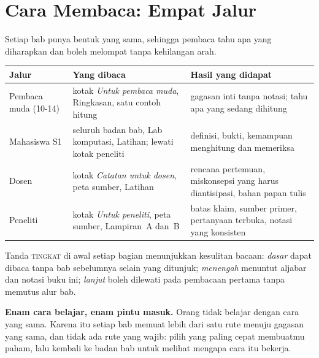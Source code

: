 \chapter*{Cara Membaca: Empat Jalur}

Setiap bab punya bentuk yang sama, sehingga pembaca tahu apa yang diharapkan dan
boleh melompat tanpa kehilangan arah.

\begin{center}
\small
\begin{tabular}{@{}p{3.1cm}p{4.6cm}p{4.4cm}@{}}
\toprule
\textbf{Jalur} & \textbf{Yang dibaca} & \textbf{Hasil yang didapat} \\
\midrule
Pembaca muda (10-14) & kotak \emph{Untuk pembaca muda}, Ringkasan, satu contoh
  hitung & gagasan inti tanpa notasi; tahu apa yang sedang dihitung \\
Mahasiswa S1 & seluruh badan bab, Lab komputasi, Latihan; lewati kotak peneliti &
  definisi, bukti, kemampuan menghitung dan memeriksa \\
Dosen & kotak \emph{Catatan untuk dosen}, peta sumber, Latihan & rencana
  pertemuan, miskonsepsi yang harus diantisipasi, bahan papan tulis \\
Peneliti & kotak \emph{Untuk peneliti}, peta sumber, Lampiran~A dan~B & batas
  klaim, sumber primer, pertanyaan terbuka, notasi yang konsisten \\
\bottomrule
\end{tabular}
\end{center}

\medskip
Tanda \textsc{tingkat} di awal setiap bagian menunjukkan kesulitan bacaan:
\emph{dasar} dapat dibaca tanpa bab sebelumnya selain yang ditunjuk;
\emph{menengah} menuntut aljabar dan notasi buku ini;
\emph{lanjut} boleh dilewati pada pembacaan pertama tanpa memutus alur bab.

\medskip
\noindent\textbf{Enam cara belajar, enam pintu masuk.} Orang tidak belajar dengan cara
yang sama. Karena itu setiap bab memuat lebih dari satu rute menuju gagasan yang sama,
dan tidak ada rute yang wajib: pilih yang paling cepat membuatmu paham, lalu kembali ke
badan bab untuk melihat mengapa cara itu bekerja.

